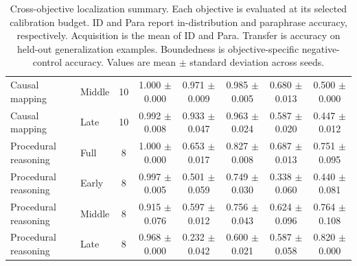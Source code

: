 \begin{table}[t]
\begin{tabular}{llcccccc}
Causal mapping & Middle & 10 & 1.000 $\pm$ 0.000 & 0.971 $\pm$ 0.009 & 0.985 $\pm$ 0.005 & 0.680 $\pm$ 0.013 & 0.500 $\pm$ 0.000 \\
Causal mapping & Late & 10 & 0.992 $\pm$ 0.008 & 0.933 $\pm$ 0.047 & 0.963 $\pm$ 0.024 & 0.587 $\pm$ 0.020 & 0.447 $\pm$ 0.012 \\
\midrule
Procedural reasoning & Full & 8 & 1.000 $\pm$ 0.000 & 0.653 $\pm$ 0.017 & 0.827 $\pm$ 0.008 & 0.687 $\pm$ 0.013 & 0.751 $\pm$ 0.095 \\
Procedural reasoning & Early & 8 & 0.997 $\pm$ 0.005 & 0.501 $\pm$ 0.059 & 0.749 $\pm$ 0.030 & 0.338 $\pm$ 0.060 & 0.440 $\pm$ 0.081 \\
Procedural reasoning & Middle & 8 & 0.915 $\pm$ 0.076 & 0.597 $\pm$ 0.012 & 0.756 $\pm$ 0.043 & 0.624 $\pm$ 0.096 & 0.764 $\pm$ 0.108 \\
Procedural reasoning & Late & 8 & 0.968 $\pm$ 0.000 & 0.232 $\pm$ 0.042 & 0.600 $\pm$ 0.021 & 0.587 $\pm$ 0.058 & 0.820 $\pm$ 0.000 \\
\bottomrule
\end{tabular}
\caption{
Cross-objective localization summary. Each objective is evaluated at its selected calibration budget. ID and Para report in-distribution and paraphrase accuracy, respectively. Acquisition is the mean of ID and Para. Transfer is accuracy on held-out generalization examples. Boundedness is objective-specific negative-control accuracy. Values are mean $\pm$ standard deviation across seeds.
}
\label{tab:cross-objective-localization}
\end{table}
